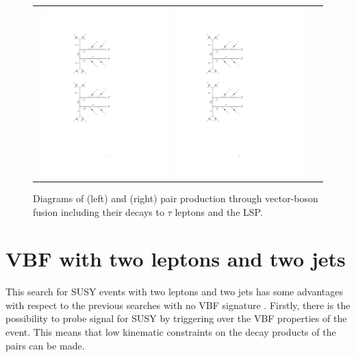 \begin{figure}[tbh!]
	\centering
	\begin{tabular}{cc}
		\includegraphics[width=0.48\textwidth]{diagrams/pics/signal_C1N2.pdf}
		\includegraphics[width=0.48\textwidth]{diagrams/pics/signal_C1C1.pdf} 		
	\end{tabular}
	\caption{Diagrams of (left) \charginopm \neutralinotwo and (right) \charginopm \charginomp pair production through vector-boson fusion including their decays to $\tau$ leptons and the LSP.}
	\label{fig:VBF_diagrams}
\end{figure}

\section{VBF with two leptons and two jets}

This search for SUSY events with two leptons and two jets has some advantages with respect to the previous searches with no VBF signature \cite{Dutta:2012xe}. Firstly, there is the possibility to probe signal for SUSY by triggering over the VBF properties of the event. This means that low kinematic constraints on the decay products of the \charginopm \charginopm pairs can be made.

